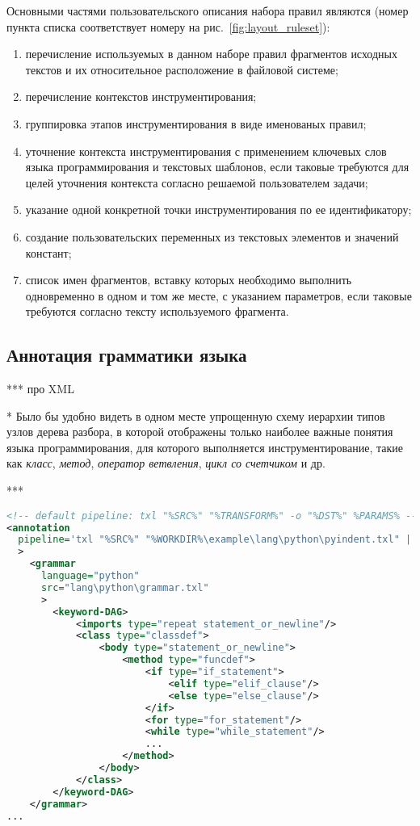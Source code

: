Основными частями пользовательского описания набора правил являются (номер пункта списка соответствует номеру на рис.~\ref{fig:layout_ruleset}):
\begin{enumerate}[noitemsep]
  \item перечисление используемых в данном наборе правил фрагментов исходных текстов и их относительное расположение в файловой системе;
  \item перечисление контекстов инструментирования;
  \item группировка этапов инструментирования в виде именованых правил;
  \item уточнение контекста инструментирования с применением ключевых слов языка программирования и текстовых шаблонов, если таковые требуются для целей уточнения контекста согласно решаемой пользователем задачи;
  \item указание одной конкретной точки инструментирования по ее идентификатору;
  \item создание пользовательских переменных из текстовых элементов и значений констант;
  \item список имен фрагментов, вставку которых необходимо выполнить одновременно в одном и том же месте, с указанием параметров, если таковые требуются согласно тексту используемого фрагмента.
\end{enumerate}

\subsection{Аннотация грамматики языка}

***
про XML

* Было бы удобно видеть в одном месте упрощенную схему иерархии типов узлов дерева разбора, в которой отображены только наиболее важные понятия языка программирования, для которого выполняется инструментирование, такие как \textit{класс}, \textit{метод}, \textit{оператор ветвления}, \textit{цикл со счетчиком} и др.

***

\begin{lstlisting}[frame=single, language=XML, label={annotation-dag-example}, caption={Пример}]
<!-- default pipeline: txl "%SRC%" "%TRANSFORM%" -o "%DST%" %PARAMS% -->
<annotation
  pipeline='txl "%SRC%" "%WORKDIR%\example\lang\python\pyindent.txl" | txl stdin "%TRANSFORM%" -o "%DST%" %PARAMS%'
  >
    <grammar
      language="python"
      src="lang\python\grammar.txl"
      >
        <keyword-DAG>
            <imports type="repeat statement_or_newline"/>
            <class type="classdef">
                <body type="statement_or_newline">
                    <method type="funcdef">
                        <if type="if_statement">
                            <elif type="elif_clause"/>
                            <else type="else_clause"/>
                        </if>
                        <for type="for_statement"/>
                        <while type="while_statement"/>
                        ...
                    </method>
                </body>
            </class>
        </keyword-DAG>
    </grammar>
...
\end{lstlisting}

